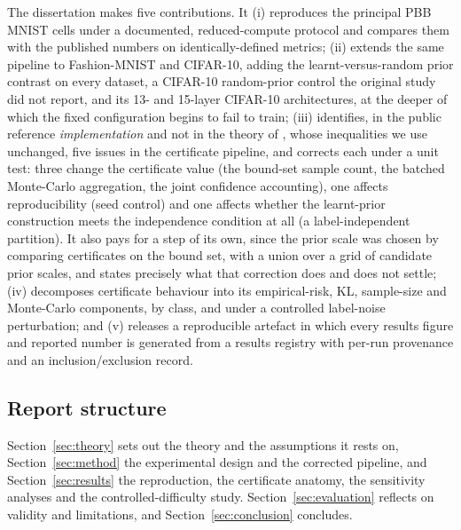 The dissertation makes five contributions. It (i) reproduces the principal PBB
MNIST cells under a documented, reduced-compute protocol and compares them with the
published numbers on identically-defined metrics; (ii) extends the same pipeline to
Fashion-MNIST and CIFAR-10, adding the learnt-versus-random prior contrast on every
dataset, a CIFAR-10 random-prior control the original study did not report, and
its 13- and 15-layer CIFAR-10 architectures, at the deeper of which the fixed
configuration begins to fail to train;
(iii) identifies, in the public reference \emph{implementation} and not in the
theory of \textcite{perezortiz2021}, whose inequalities we use unchanged, five
issues in the certificate pipeline, and corrects each under a unit test: three
change the certificate value (the bound-set sample count, the batched Monte-Carlo
aggregation, the joint confidence accounting), one affects reproducibility (seed
control) and one affects whether the learnt-prior construction meets the
independence condition at all (a label-independent partition). It also pays for a
step of its own, since the prior scale was chosen by comparing certificates on
the bound set, with a union over a grid of candidate prior scales, and states
precisely what that correction does and does not settle;
(iv) decomposes certificate behaviour into its empirical-risk, KL, sample-size and
Monte-Carlo components, by class, and under a controlled label-noise perturbation;
and (v) releases a reproducible artefact in which every results figure and
reported number is generated from a results registry with per-run provenance and an
inclusion/exclusion record.

\subsection{Report structure}\label{sec:structure}

Section~\ref{sec:theory} sets out the theory and the assumptions it rests on,
Section~\ref{sec:method} the experimental design and the corrected pipeline, and
Section~\ref{sec:results} the reproduction, the certificate anatomy, the
sensitivity analyses and the controlled-difficulty study.
Section~\ref{sec:evaluation} reflects on validity and limitations, and
Section~\ref{sec:conclusion} concludes.
